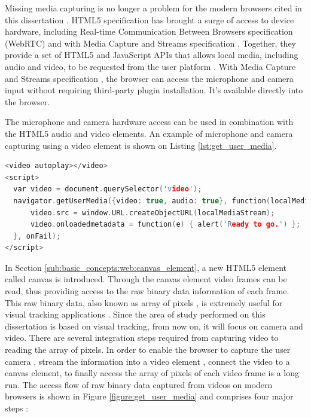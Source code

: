 Missing media capturing is no longer a problem for the modern browsers cited in this dissertation \cite{WebRTC2013,Hickson2013}. HTML5 specification has brought a surge of access to device hardware, including Real-time Communication Between Browsers specification (WebRTC) \cite{WebRTC2013} and with Media Capture and Streams specification \cite{MediaCapture2013}. Together, they provide a set of HTML5 and JavaScript APIs \cite{WebRTC2013} that allows local media, including audio and video, to be requested from the user platform \cite{WC2006}. With Media Capture and Streams specification \cite{MediaCapture2013}, the browser can access the microphone and camera input without requiring third-party plugin installation. It's available directly into the browser.

The microphone and camera hardware access can be used in combination with the HTML5 audio and video elements. An example of microphone and camera capturing using a video element is shown on Listing \ref{lst:get_user_media}.

\begin{lstlisting}[language=C++,label={lst:get_user_media},caption=Capture microphone and camera and display using a HTML5 video element.]
<video autoplay></video>
<script>
  var video = document.querySelector('video');
  navigator.getUserMedia({video: true, audio: true}, function(localMediaStream) {
      video.src = window.URL.createObjectURL(localMediaStream);
      video.onloadedmetadata = function(e) { alert('Ready to go.') };
  }, onFail);
</script>
\end{lstlisting}

In Section \ref{sub:basic_concepts:web:canvas_element}, a new HTML5 element called canvas \cite{Canvas2013} is introduced. Through the canvas element video frames can be read, thus providing access to the raw binary data information of each frame. This raw binary data, also known as array of pixels \cite{Gonzalez2007}, is extremely useful for visual tracking applications \cite{Teichrieb2007}. Since the area of study performed on this dissertation is based on visual tracking, from now on, it will focus on camera and video. There are several integration steps required from capturing video to reading the array of pixels. In order to enable the browser to capture the user camera \cite{MediaCapture2013}, stream the information into a video element \cite{Hickson2013}, connect the video to a canvas element, to finally access the array of pixels of each video frame is a long run. The access flow of raw binary data captured from videos on modern browsers is shown in Figure \ref{figure:get_user_media} and comprises four major steps \cite{WebRTC2013,Rocks2013}:

